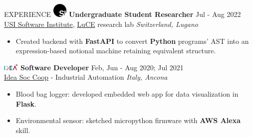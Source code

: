 \documentclass{cv} %
\def\intraexpvspace{0.15cm}
\begin{document}
\begin{minipage}[b][0.9\paperheight][t]{0.7\linewidth}
\begin{rSection}{EXPERIENCE}
    \includegraphics[width=0.7cm, trim={0cm 10cm 0cm 0cm}]{si-icon.jpg}
    \hspace*{0cm}\textbf{Undergraduate Student Researcher} \hfill Jul - Aug 2022\\
    \hspace*{0.85cm}\href{https://www.si.usi.ch/}{USI Software Institute},
    \href{https://luce.si.usi.ch/team/}{LuCE} research lab
    \hfill \textit{Switzerland, Lugano}
    \begin{itemize}
        \item Created backend with \textbf{FastAPI} to convert \textbf{Python} programs' AST
              into an expression-based notional machine retaining equivalent structure.
    \end{itemize}
    \vspace{\intraexpvspace}
    \vspace{\intraexpvspace}

    \includegraphics[width=0.75cm, trim={0cm 1.5cm 0cm 0cm}]{idea-icon.png}
    \textbf{Software Developer} \hfill Feb, Jun - Aug 2020; Jul 2021\\
    \hspace*{0.85cm}\href{https://idea-on-line.it/}{Idea Soc Coop} - Industrial Automation 
    \hfill \textit{Italy, Ancona}
    \begin{itemize}
        \item Blood bag logger: 
            developed embedded web app for data visualization in \textbf{Flask}.

        \item Environmental sensor: 
            sketched micropython firmware with \textbf{AWS Alexa} skill.
    \end{itemize}
    \vspace{\intraexpvspace}
    \vspace{\intraexpvspace}


\end{rSection}
\end{minipage}
\end{document}
